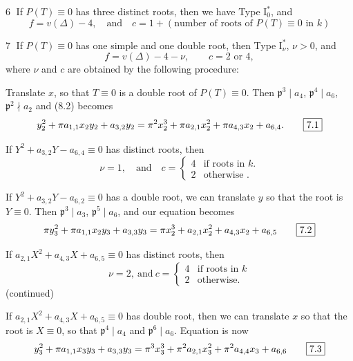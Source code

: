 \reversemarginpar
{}\textcircled{6} If $P(T)\equiv0$ has three distinct roots, then we have Type $\mathrm I_0^{*}$, and
\[
 f=v(\Delta)-4,\quad\text{and}\quad c=1+(\text{number of roots of }P(T)\equiv0\text{ in }k)
\]

\textcircled{7} If $P(T)\equiv0$ has one simple and one double root, then Type $\mathrm I_{\nu}^{*}$, $\nu>0$, and
\[
 f=v(\Delta)-4-\nu,\qquad c=2\text{ or }4,
\]
where $\nu$ and $c$ are obtained by the following procedure:

%
Translate $x$, so that $T\equiv0$ is a double root of $P(T)\equiv0$. Then $\mathfrak p^3\mid a_4$, $\mathfrak p^4\mid a_6$, $\mathfrak p^2\nmid a_2$ and (8.2) becomes
\[
 y_2^2+\pi a_{1,1}x_2y_2+a_{3,2}y_2
 =\pi^2x_2^3+\pi a_{2,1}x_2^2+\pi a_{4,3}x_2+a_{6,4}.
 \tag*{\fbox{7.1}}
\]

If $Y^2+a_{3,2}Y-a_{6,4}\equiv0$ has distinct roots, then
\[
 \nu=1,\quad\text{and}\quad c=\begin{cases}4&\text{if roots in }k.\\2&\text{otherwise }.\end{cases}
\]

If $Y^2+a_{3,2}Y-a_{6,2}\equiv0$ has a double root, we can translate $y$ so that the root is $Y\equiv0$. Then $\mathfrak p^3\mid a_3$, $\mathfrak p^5\mid a_6$, and our equation becomes
\[
 \pi y_3^2+\pi a_{1,1}x_2y_3+a_{3,3}y_3
 =\pi x_2^3+a_{2,1}x_2^2+a_{4,3}x_2+a_{6,5}
 \tag*{\fbox{7.2}}
\]

If $a_{2,1}X^2+a_{4,3}X+a_{6,5}\equiv0$ has distinct roots, then
\[
 \nu=2,\ \text{and}\ c=\begin{cases}4&\text{if roots in }k\\2&\text{otherwise}.\end{cases}
\]
\normalmarginpar
\hfill(continued)
\endgroup

\begingroup
\makeatletter
\tagsleft@true
\makeatother
\reversemarginpar
{}
If $a_{2,1}X^2+a_{4,3}X+a_{6,5}\equiv0$ has double root, then we can translate $x$ so that the root is $X\equiv0$, so that $\mathfrak p^4\mid a_4$ and $\mathfrak p^6\mid a_6$. Equation is now
\[
 y_3^2+\pi a_{1,1}x_3y_3+a_{3,3}y_3
 =\pi^3x_3^3+\pi^2a_{2,1}x_3^2+\pi^2a_{4,4}x_3+a_{6,6}
 \tag*{\fbox{7.3}}
\]

